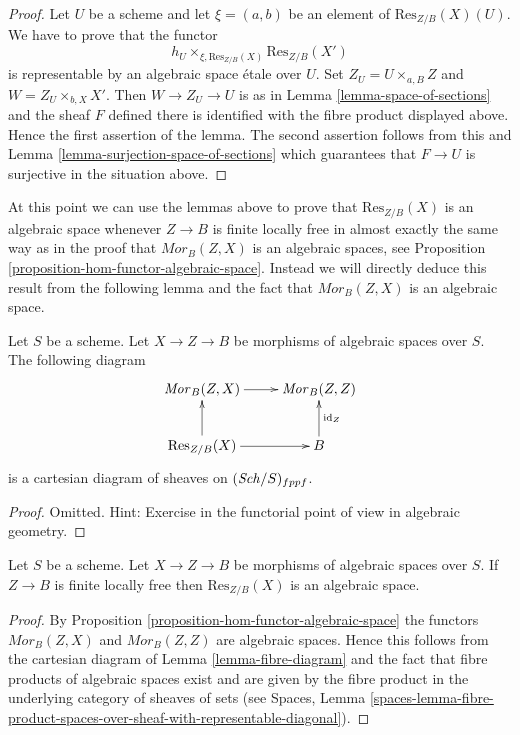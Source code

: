 \begin{proof}
Let $U$ be a scheme and let $\xi = (a, b)$ be an element of
$\text{Res}_{Z/B}(X)(U)$. We have to prove that the functor
$$
h_U \times_{\xi, \text{Res}_{Z/B}(X)} \text{Res}_{Z/B}(X')
$$
is representable by an algebraic space \'etale over $U$. Set
$Z_U = U \times_{a, B} Z$ and $W = Z_U \times_{b, X} X'$.
Then $W \to Z_U \to U$ is as in
Lemma \ref{lemma-space-of-sections}
and the sheaf $F$ defined there is identified with the fibre product
displayed above. Hence the first assertion of the lemma.
The second assertion follows from this and
Lemma \ref{lemma-surjection-space-of-sections}
which guarantees that $F \to U$ is surjective in the situation above.
\end{proof}

\noindent
At this point we can use the lemmas above to prove that $\text{Res}_{Z/B}(X)$
is an algebraic space whenever $Z \to B$ is finite locally free in almost
exactly the same way as in the proof that $\mathit{Mor}_B(Z, X)$ is an
algebraic spaces, see
Proposition \ref{proposition-hom-functor-algebraic-space}.
Instead we will directly deduce this result from the following lemma
and the fact that $\mathit{Mor}_B(Z, X)$ is an algebraic space.

\begin{lemma}
\label{lemma-fibre-diagram}
Let $S$ be a scheme. Let $X \to Z \to B$ be morphisms of
algebraic spaces over $S$. The following diagram
$$
\xymatrix{
\mathit{Mor}_B(Z, X) \ar[r] & \mathit{Mor}_B(Z, Z) \\
\text{Res}_{Z/B}(X) \ar[r] \ar[u] & B \ar[u]_{\text{id}_Z}
}
$$
is a cartesian diagram of sheaves on $(\mathit{Sch}/S)_{fppf}$.
\end{lemma}

\begin{proof}
Omitted. Hint: Exercise in the functorial point of view in algebraic
geometry.
\end{proof}

\begin{proposition}
\label{proposition-restriction-of-scalars-algebraic-space}
Let $S$ be a scheme. Let $X \to Z \to B$ be morphisms of
algebraic spaces over $S$. If $Z \to B$ is finite locally free
then $\text{Res}_{Z/B}(X)$ is an algebraic space.
\end{proposition}

\begin{proof}
By
Proposition \ref{proposition-hom-functor-algebraic-space}
the functors $\mathit{Mor}_B(Z, X)$ and $\mathit{Mor}_B(Z, Z)$
are algebraic spaces. Hence this follows from the cartesian
diagram of
Lemma \ref{lemma-fibre-diagram}
and the fact that fibre products of algebraic spaces exist and
are given by the fibre product in the underlying category of
sheaves of sets (see
Spaces, Lemma
\ref{spaces-lemma-fibre-product-spaces-over-sheaf-with-representable-diagonal}).
\end{proof}

